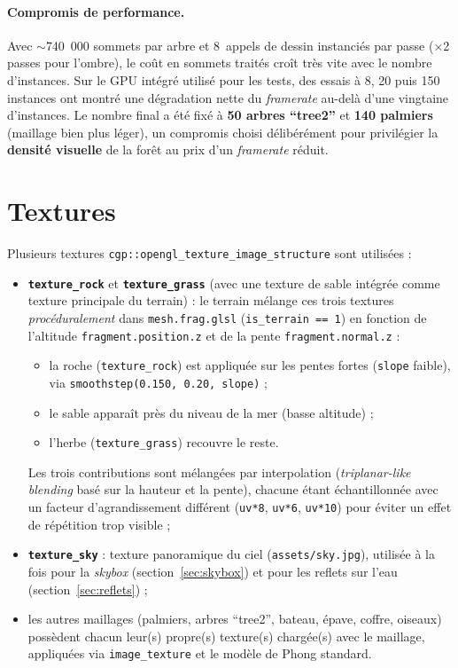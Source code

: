 \documentclass[11pt,a4paper]{article}
\begin{document}
\paragraph{Compromis de performance.} Avec $\sim$740~000 sommets par
arbre et 8~appels de dessin instanciés par passe (×2 passes pour
l'ombre), le coût en sommets traités croît très vite avec le nombre
d'instances. Sur le GPU intégré utilisé pour les tests, des essais à 8,
20 puis 150 instances ont montré une dégradation nette du
\emph{framerate} au-delà d'une vingtaine d'instances. Le nombre final a
été fixé à \textbf{50 arbres ``tree2''} et \textbf{140 palmiers}
(maillage bien plus léger), un compromis choisi délibérément pour
privilégier la \textbf{densité visuelle} de la forêt au prix d'un
\emph{framerate} réduit.

\section{Textures}

Plusieurs textures \texttt{cgp::opengl\_texture\_image\_structure} sont
utilisées :

\begin{itemize}
    \item \textbf{\texttt{texture\_rock}} et \textbf{\texttt{texture\_grass}}
    (avec une texture de sable intégrée comme texture principale du
    terrain) : le terrain mélange ces trois textures
    \emph{procéduralement} dans \texttt{mesh.frag.glsl}
    (\texttt{is\_terrain == 1}) en fonction de l'altitude
    \texttt{fragment.position.z} et de la pente
    \texttt{fragment.normal.z} :
    \begin{itemize}
        \item la roche (\texttt{texture\_rock}) est appliquée sur les
        pentes fortes (\texttt{slope} faible), via
        \texttt{smoothstep(0.150, 0.20, slope)} ;
        \item le sable apparaît près du niveau de la mer (basse
        altitude) ;
        \item l'herbe (\texttt{texture\_grass}) recouvre le reste.
    \end{itemize}
    Les trois contributions sont mélangées par interpolation
    (\emph{triplanar-like blending} basé sur la hauteur et la pente),
    chacune étant échantillonnée avec un facteur d'agrandissement
    différent (\texttt{uv*8}, \texttt{uv*6}, \texttt{uv*10}) pour éviter
    un effet de répétition trop visible ;
    \item \textbf{\texttt{texture\_sky}} : texture panoramique du ciel
    (\texttt{assets/sky.jpg}), utilisée à la fois pour la \emph{skybox}
    (section~\ref{sec:skybox}) et pour les reflets sur l'eau
    (section~\ref{sec:reflets}) ;
    \item les autres maillages (palmiers, arbres ``tree2'', bateau,
    épave, coffre, oiseaux) possèdent chacun leur(s) propre(s) texture(s)
    chargée(s) avec le maillage, appliquées via
    \texttt{image\_texture} et le modèle de Phong standard.
\end{itemize}
\end{document}
